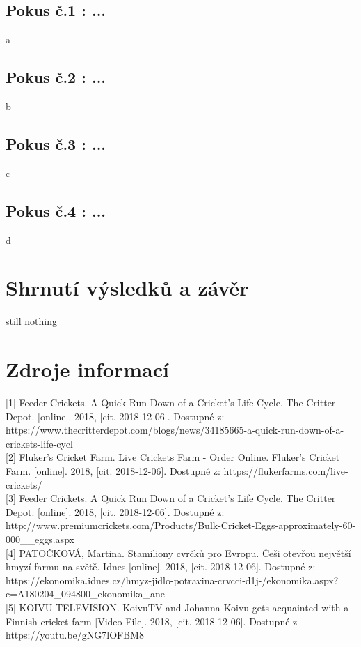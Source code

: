 \documentclass[a4paper, 12pt]{article}
\begin{document}
\subsection{Pokus č.1 : ...}
a
\subsection{Pokus č.2 : ...}
b
\subsection{Pokus č.3 : ...}
c
\subsection{Pokus č.4 : ...}
d
\section{Shrnutí výsledků a závěr}
still nothing


\newpage

\section{Zdroje informací} \label{zdroje}
\setlength\parindent{0pt}

[1] Feeder Crickets. A Quick Run Down of a Cricket's Life Cycle. The Critter Depot. [online]. 2018, [cit. 2018-12-06]. Dostupné z: https://www.thecritterdepot.com/blogs/news/34185665-a-quick-run-down-of-a-crickets-life-cycl\\

[2] Fluker's Cricket Farm. Live Crickets Farm - Order Online. Fluker's Cricket Farm. [online]. 2018, [cit. 2018-12-06]. Dostupné z: https://flukerfarms.com/live-crickets/ \\

[3] Feeder Crickets. A Quick Run Down of a Cricket's Life Cycle. The Critter Depot. [online]. 2018, [cit. 2018-12-06]. Dostupné z: http://www.premiumcrickets.com/Products/Bulk-Cricket-Eggs-approximately-60-000\_\_eggs.aspx \\

[4] PATOČKOVÁ, Martina. Stamiliony cvrčků pro Evropu. Češi otevřou největší hmyzí farmu na světě. Idnes [online]. 2018, [cit. 2018-12-06]. Dostupné z: https://ekonomika.idnes.cz/hmyz-jidlo-potravina-crvcci-d1j-/ekonomika.aspx?c=A180204\_094800\_ekonomika\_ane\\

[5] KOIVU TELEVISION. KoivuTV and Johanna Koivu gets acquainted with a Finnish cricket farm [Video File]. 2018, [cit. 2018-12-06]. Dostupné z https://youtu.be/gNG7lOFBM8\\
\end{document}
